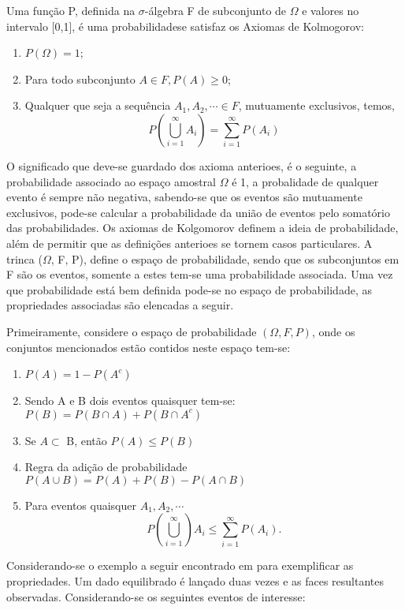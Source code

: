 \begin{defin}[Probabilidade]
 Uma fun\c{c}\~{a}o P, definida na $\sigma$-\'{a}lgebra F de subconjunto de $\Omega$ e valores no intervalo [0,1],
 \'{e} uma probabilidadese satisfaz os Axiomas de Kolmogorov: \\
 \begin{enumerate}
   \item $P(\Omega)= 1$;
   \item Para todo subconjunto $ A \in F, P(A) \geq 0$;
   \item Qualquer que seja a sequ\^{e}ncia $A_1, A_2, \cdots \in F$, mutuamente exclusivos, temos,
	 $$P( \bigcup\limits_{i = 1}^{\infty}A_i) = \sum\limits_{i = 1}^{\infty} P(A_i)$$ 
 \end{enumerate}
  \end{defin}
  O significado que deve-se guardado dos axioma anterioes, \'{e} o seguinte, a probabilidade associado ao espa\c{c}o amostral $\Omega$ 
  \'{e} 1, a probalidade de qualquer evento \'{e} sempre n\~{a}o negativa, sabendo-se que os eventos s\~{a}o mutuamente exclusivos,
  pode-se calcular a probabilidade da uni\~{a}o de eventos pelo somat\'{o}rio das probabilidades. Os axiomas de Kolgomorov definem a ideia
  de probabilidade, al\'{e}m de permitir que as defini\c{c}\~{o}es anterioes se tornem casos particulares. A trinca ($\Omega$, F, P),
  define o espa\c{c}o de probabilidade, sendo que os subconjuntos em F s\~{a}o os eventos, somente a estes tem-se uma
  probabilidade associada. Uma vez que probabilidade est\'{a} bem definida pode-se no espa\c{c}o de probabilidade, as propriedades 
  associadas s\~{a}o elencadas a seguir.
  \par
  Primeiramente, considere o espa\c{c}o de probabilidade $(\Omega, F, P )$, onde os conjuntos mencionados est\~{a}o contidos neste
  espa\c{c}o tem-se:
  \begin{enumerate}
	\item $P(A) = 1 - P(A^c)$ 
	\item Sendo A e B dois eventos quaisquer tem-se: \\
	  $P(B)= P(B \cap A) + P(B \cap A^c) $
	\item Se $ A \subset $ B, ent\~{a}o $P(A) \leq P(B)$
	\item Regra da adi\c{c}\~{a}o de probabilidade  \\
	  $ P(A \cup B )= P(A) +  P(B) - P(A \cap B)$ 
	\item Para eventos quaisquer $A_1, A_2, \cdots $ \\
	  $$P(\bigcup\limits_{i = 1}^{\infty})A_i \leq \sum\limits_{i = 1}^{\infty} P(A_i).$$
  \end{enumerate}
  \par
  Considerando-se o exemplo a seguir encontrado em \cite{magalhaes} para exemplificar as propriedades. 
  Um dado equilibrado \'{e} lan\c{c}ado duas vezes e as faces resultantes observadas. Considerando-se os seguintes eventos de
  interesse:

